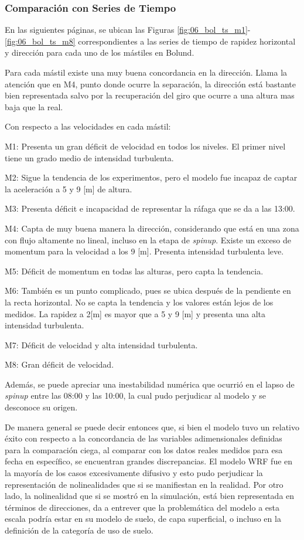 \subsubsection{Comparación con Series de Tiempo}
En las siguientes páginas, se ubican las Figuras \ref{fig:06_bol_ts_m1}-\ref{fig:06_bol_ts_m8} correspondientes a las series de tiempo de rapidez horizontal y dirección para cada uno de los mástiles en Bolund. 

Para cada mástil existe una muy buena concordancia en la dirección. Llama la atención que en M4, punto donde ocurre la separación, la dirección está bastante bien representada salvo por la recuperación del giro que ocurre a una altura mas baja que la real. 

Con respecto a las velocidades en cada mástil:
\begin{itemize*}
	\item M1: Presenta un gran déficit de velocidad en todos los niveles. El primer nivel tiene un grado medio de intensidad turbulenta.
	\item M2: Sigue la tendencia de los experimentos, pero el modelo fue incapaz de captar la aceleración a 5 y 9 [m] de altura.
	\item M3: Presenta déficit e incapacidad de representar la ráfaga que se da a las 13:00.
	\item M4: Capta de muy buena manera la dirección, considerando que está en una zona con flujo altamente no lineal, incluso en la etapa de \emph{spinup}. Existe un exceso de momentum para la velocidad a los 9 [m]. Presenta intensidad turbulenta leve.
	\item M5: Déficit de momentum en todas las alturas, pero capta la tendencia.
	\item M6: También es un punto complicado, pues se ubica después de la pendiente en la recta horizontal. No se capta la tendencia y los valores están lejos de los medidos. La rapidez a 2[m] es mayor que a 5 y 9 [m] y presenta una alta intensidad turbulenta.
	\item M7: Déficit de velocidad y alta intensidad turbulenta.
	\item M8: Gran déficit de velocidad.
\end{itemize*} 

Además, se puede apreciar una inestabilidad numérica que ocurrió en el lapso de \emph{spinup} entre las 08:00 y las 10:00, la cual pudo perjudicar al modelo y se desconoce su origen.

De manera general se puede decir entonces que, si bien el modelo tuvo un relativo éxito con respecto a la concordancia de las variables adimensionales definidas para la comparación ciega, al comparar con los datos reales medidos para esa fecha en específico, se encuentran grandes discrepancias. El modelo WRF fue en la mayoría de los casos excesivamente difusivo y esto pudo perjudicar la representación de nolinealidades que si se manifiestan en la realidad. Por otro lado, la nolinealidad que si se mostró en la simulación, está bien representada en términos de direcciones, da a entrever que la problemática del modelo a esta escala podría estar en su modelo de suelo, de capa superficial, o incluso en la definición de la categoría de uso de suelo.

